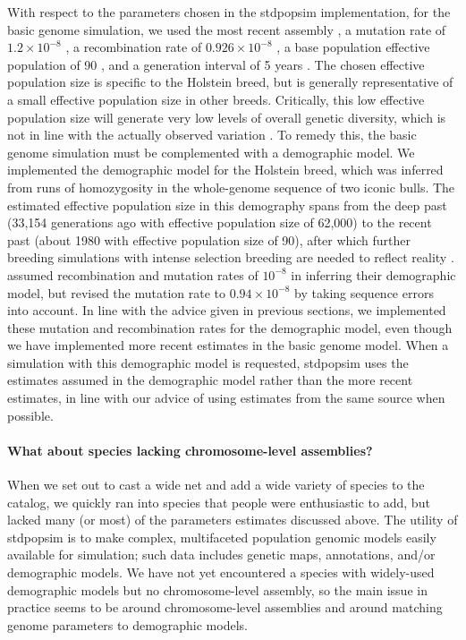 \documentclass[hidelinks]{article}
\begin{document}
With respect to the parameters chosen in the stdpopsim implementation,
for the basic genome simulation, we used the most recent assembly
\citep{Rosen2020}, a mutation rate of \(1.2 \times 10^{-8}\) \citep{Harland2017},
a recombination rate of \(0.926 \times 10^{-8}\) \citep{Ma2015}, a base population
effective population of 90 \citep{MacLeod2013}, and a generation interval of 5
years \citep{MacLeod2013}. The chosen effective population size is specific
to the Holstein breed, but is generally representative of a small
effective population size in other breeds. Critically, this low
effective population size will generate very low levels of overall
genetic diversity, which is not in line with the actually observed
variation \citep[e.g.,][]{Rosen2020}. To remedy this, the basic genome
simulation must be complemented with a demographic model. We implemented
the \cite{MacLeod2013} demographic model for the Holstein breed, which was
inferred from runs of homozygosity in the whole-genome sequence of two
iconic bulls. The estimated effective population size in this demography
spans from the deep past (33,154 generations ago with effective population size
of 62,000) to the recent past (about 1980 with effective population size of 90),
after which further breeding simulations with intense selection breeding are
needed to reflect reality \citep[e.g.,][]{
MacLeod2014, Gaynor2020, Obsteter2021}. \cite{MacLeod2013} assumed
recombination and mutation rates of \(10^{-8}\) in inferring their
demographic model, but revised the mutation rate to \(0.94 \times 10^{-8}\) by
taking sequence errors into account. In line with the advice given in
previous sections, we implemented these mutation and recombination rates
for the \cite{MacLeod2013} demographic model, even though we have implemented
more recent estimates in the basic genome model. 
When a simulation with this demographic model is requested, stdpopsim uses the
estimates assumed in the demographic model rather than the more
recent estimates, in line with our advice of using estimates from the same
source when possible.

\hypertarget{what-about-species-lacking-chromosome-level-assemblies}{%
\paragraph{What about species lacking chromosome-level
assemblies?}\label{what-about-species-lacking-chromosome-level-assemblies}}

When we set out to cast a wide net and add a wide variety of species to
the catalog, we quickly ran into species that people were enthusiastic
to add, but lacked many (or most) of the parameters estimates discussed above. The
utility of stdpopsim is to make complex, multifaceted population genomic models easily available for
simulation; such data includes genetic maps, annotations, and/or
demographic models. We have not yet encountered a species with
widely-used demographic models but no chromosome-level assembly, so the
main issue in practice seems to be around chromosome-level assemblies
and around matching genome parameters to demographic models.
\end{document}
